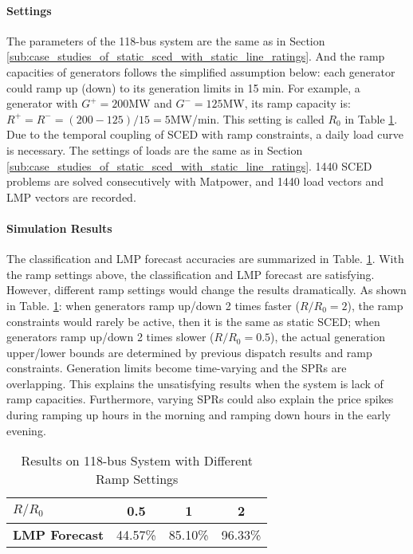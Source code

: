 \documentclass[letterpaper, 11pt]{article}
\theoremstyle{plain}
\theoremstyle{definition}
\begin{document}
\paragraph{Settings} \label{par:settings}
The parameters of the 118-bus system are the same as in Section \ref{sub:case_studies_of_static_sced_with_static_line_ratings}. And the ramp capacities of generators follows the simplified assumption below: each generator could ramp up (down) to its generation limits in 15 min. For example, a generator with $G^+ = 200$MW and $G^- = 125$MW, its ramp capacity is: $R^+ = R^- = (200-125)/15 = 5$MW/min. This setting is called $R_0$ in Table \ref{tab:118_bus_diff_ramp}.
Due to the temporal coupling of SCED with ramp constraints, a daily load curve is necessary.
The settings of loads are the same as in Section \ref{sub:case_studies_of_static_sced_with_static_line_ratings}. 1440 SCED problems are solved consecutively with Matpower, and 1440 load vectors and LMP vectors are recorded.
\paragraph{Simulation Results} \label{par:simulation_results}
The classification and LMP forecast accuracies are summarized in Table. \ref{tab:118_bus_diff_ramp}.
With the ramp settings above, the classification and LMP forecast are satisfying. 
However, different ramp settings would change the results dramatically. As shown in Table. \ref{tab:118_bus_diff_ramp}: when generators ramp up/down 2 times faster ($R/R_0 = 2$), the ramp constraints would rarely be active, then it is the same as static SCED; when generators ramp up/down 2 times slower ($R/R_0 = 0.5$), the actual generation upper/lower bounds are determined by previous dispatch results and ramp constraints. Generation limits become time-varying and the SPRs are overlapping. This explains the unsatisfying results when the system is lack of ramp capacities. Furthermore, varying SPRs could also explain the price spikes during ramping up hours in the morning and ramping down hours in the early evening.

\begin{table}[htbp]
  \caption{Results on 118-bus System with Different Ramp Settings}
  \label{tab:118_bus_diff_ramp}
  \centering

  \begin{tabular}{l|ccc}
  \hline

  \hline
  $R/R_0$ & 0.5 & 1 & 2 \\
  \hline
  \textbf{LMP Forecast} & 44.57\% & 85.10\% & 96.33\% \\
  \hline

  \hline
  \end{tabular}
\end{table}
\end{document}
